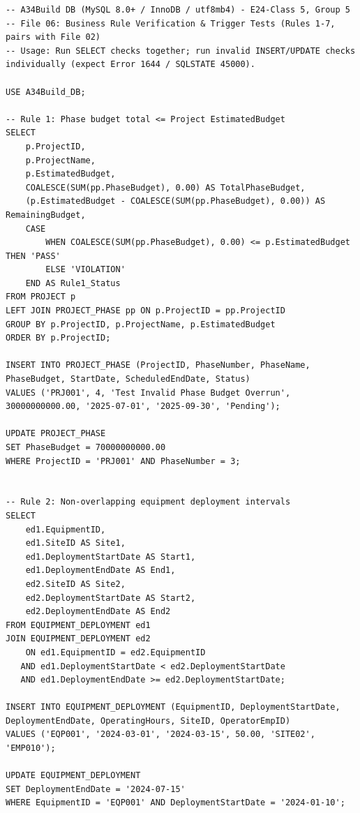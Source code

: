 \documentclass[a4paper,12pt]{report}
\begin{document}
\begin{lstlisting}
-- A34Build DB (MySQL 8.0+ / InnoDB / utf8mb4) - E24-Class 5, Group 5
-- File 06: Business Rule Verification & Trigger Tests (Rules 1-7, pairs with File 02)
-- Usage: Run SELECT checks together; run invalid INSERT/UPDATE checks individually (expect Error 1644 / SQLSTATE 45000).

USE A34Build_DB;

-- Rule 1: Phase budget total <= Project EstimatedBudget
SELECT 
    p.ProjectID,
    p.ProjectName,
    p.EstimatedBudget,
    COALESCE(SUM(pp.PhaseBudget), 0.00) AS TotalPhaseBudget,
    (p.EstimatedBudget - COALESCE(SUM(pp.PhaseBudget), 0.00)) AS RemainingBudget,
    CASE 
        WHEN COALESCE(SUM(pp.PhaseBudget), 0.00) <= p.EstimatedBudget THEN 'PASS'
        ELSE 'VIOLATION'
    END AS Rule1_Status
FROM PROJECT p
LEFT JOIN PROJECT_PHASE pp ON p.ProjectID = pp.ProjectID
GROUP BY p.ProjectID, p.ProjectName, p.EstimatedBudget
ORDER BY p.ProjectID;

INSERT INTO PROJECT_PHASE (ProjectID, PhaseNumber, PhaseName, PhaseBudget, StartDate, ScheduledEndDate, Status)
VALUES ('PRJ001', 4, 'Test Invalid Phase Budget Overrun', 30000000000.00, '2025-07-01', '2025-09-30', 'Pending');

UPDATE PROJECT_PHASE
SET PhaseBudget = 70000000000.00
WHERE ProjectID = 'PRJ001' AND PhaseNumber = 3;


-- Rule 2: Non-overlapping equipment deployment intervals
SELECT 
    ed1.EquipmentID,
    ed1.SiteID AS Site1,
    ed1.DeploymentStartDate AS Start1,
    ed1.DeploymentEndDate AS End1,
    ed2.SiteID AS Site2,
    ed2.DeploymentStartDate AS Start2,
    ed2.DeploymentEndDate AS End2
FROM EQUIPMENT_DEPLOYMENT ed1
JOIN EQUIPMENT_DEPLOYMENT ed2
    ON ed1.EquipmentID = ed2.EquipmentID
   AND ed1.DeploymentStartDate < ed2.DeploymentStartDate
   AND ed1.DeploymentEndDate >= ed2.DeploymentStartDate;

INSERT INTO EQUIPMENT_DEPLOYMENT (EquipmentID, DeploymentStartDate, DeploymentEndDate, OperatingHours, SiteID, OperatorEmpID)
VALUES ('EQP001', '2024-03-01', '2024-03-15', 50.00, 'SITE02', 'EMP010');

UPDATE EQUIPMENT_DEPLOYMENT
SET DeploymentEndDate = '2024-07-15'
WHERE EquipmentID = 'EQP001' AND DeploymentStartDate = '2024-01-10';



\end{lstlisting}
\end{document}
